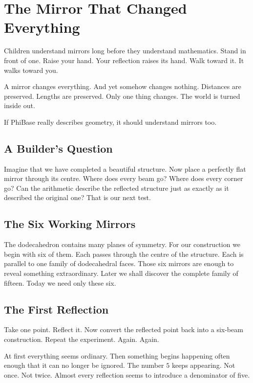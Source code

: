 \chapter{The Mirror That Changed Everything}
\label{stone:mirrors}

Children understand mirrors long before they understand mathematics. Stand in front of one. Raise your hand. Your reflection raises its hand. Walk toward it. It walks toward you.

A mirror changes everything. And yet somehow changes nothing. Distances are preserved. Lengths are preserved. Only one thing changes. The world is turned inside out.

If PhiBase really describes geometry, it should understand mirrors too.

\section*{A Builder's Question}

Imagine that we have completed a beautiful structure. Now place a perfectly flat mirror through its centre. Where does every beam go? Where does every corner go? Can the arithmetic describe the reflected structure just as exactly as it described the original one? That is our next test.

\section*{The Six Working Mirrors}

The dodecahedron contains many planes of symmetry. For our construction we begin with six of them. Each passes through the centre of the structure. Each is parallel to one family of dodecahedral faces. Those six mirrors are enough to reveal something extraordinary. Later we shall discover the complete family of fifteen. Today we need only these six.

\section*{The First Reflection}

Take one point. Reflect it. Now convert the reflected point back into a six-beam construction. Repeat the experiment. Again. Again.

At first everything seems ordinary. Then something begins happening often enough that it can no longer be ignored. The number \(5\) keeps appearing. Not once. Not twice. Almost every reflection seems to introduce a denominator of five.

